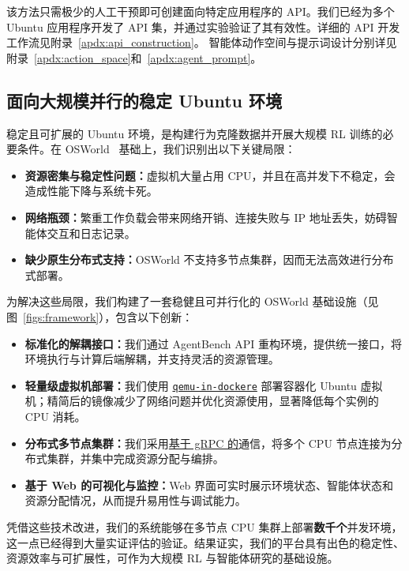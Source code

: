 该方法只需极少的人工干预即可创建面向特定应用程序的 API。我们已经为多个 Ubuntu 应用程序开发了 API 集，并通过实验验证了其有效性。详细的 API 开发工作流见附录~\ref{apdx:api_construction}。
智能体动作空间与提示词设计分别详见附录~\ref{apdx:action_space}和~\ref{apdx:agent_prompt}。

\subsection{面向大规模并行的稳定 Ubuntu 环境}\label{sec:stable-ubuntu}
稳定且可扩展的 Ubuntu 环境，是构建行为克隆数据并开展大规模 RL 训练的必要条件。在 OSWorld~\citep{xie2024osworld} 基础上，我们识别出以下关键局限：

\begin{itemize}[leftmargin=1.5em,itemsep=0pt,parsep=0.2em,topsep=0.0em,partopsep=0.0em]
    \item \textbf{资源密集与稳定性问题：}虚拟机大量占用 CPU，并且在高并发下不稳定，会造成性能下降与系统卡死。
    \item \textbf{网络瓶颈：}繁重工作负载会带来网络开销、连接失败与 IP 地址丢失，妨碍智能体交互和日志记录。
    \item \textbf{缺少原生分布式支持：}OSWorld 不支持多节点集群，因而无法高效进行分布式部署。
\end{itemize}

为解决这些局限，我们构建了一套稳健且可并行化的 OSWorld 基础设施（见图~\ref{figs:framework}），包含以下创新：
\begin{itemize}[leftmargin=1.5em,itemsep=0pt,parsep=0.2em,topsep=0.0em,partopsep=0.0em]
    \item \textbf{标准化的解耦接口：}我们通过 AgentBench API 重构环境，提供统一接口，将环境执行与计算后端解耦，并支持灵活的资源管理。
    \item \textbf{轻量级虚拟机部署：}我们使用 \href{https://github.com/qemus/qemu}{\texttt{qemu-in-dockere}} 部署容器化 Ubuntu 虚拟机；精简后的镜像减少了网络问题并优化资源使用，显著降低每个实例的 CPU 消耗。
    \item \textbf{分布式多节点集群：}我们采用\href{https://github.com/grpc}{基于 gRPC 的}通信，将多个 CPU 节点连接为分布式集群，并集中完成资源分配与编排。
    \item \textbf{基于 Web 的可视化与监控：}Web 界面可实时展示环境状态、智能体状态和资源分配情况，从而提升易用性与调试能力。
\end{itemize}

凭借这些技术改进，我们的系统能够在多节点 CPU 集群上部署\textbf{数千个}并发环境，这一点已经得到大量实证评估的验证。结果证实，我们的平台具有出色的稳定性、资源效率与可扩展性，可作为大规模 RL 与智能体研究的基础设施。

